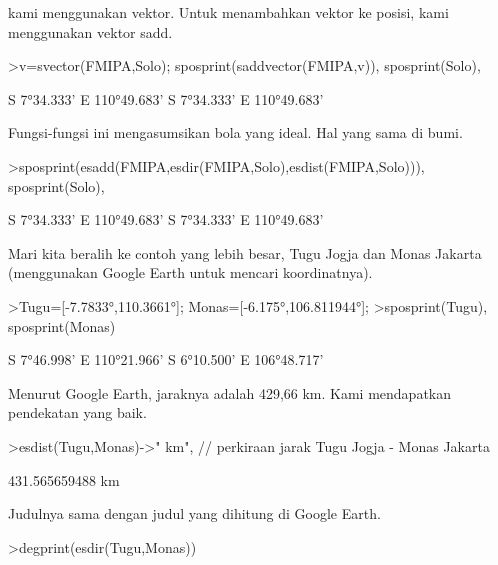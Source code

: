 \documentclass[a4paper,10pt]{article}
\begin{document}
\begin{eulernotebook}
\begin{eulercomment}
\begin{eulercomment}
\begin{eulercomment}
kami menggunakan vektor. Untuk menambahkan vektor ke posisi, kami
menggunakan vektor sadd.
\end{eulercomment}
\begin{eulerprompt}
>v=svector(FMIPA,Solo); sposprint(saddvector(FMIPA,v)), sposprint(Solo),
\end{eulerprompt}
\begin{euleroutput}
  S 7°34.333' E 110°49.683'
  S 7°34.333' E 110°49.683'
\end{euleroutput}
\begin{eulercomment}
Fungsi-fungsi ini mengasumsikan bola yang ideal. Hal yang sama di
bumi.
\end{eulercomment}
\begin{eulerprompt}
>sposprint(esadd(FMIPA,esdir(FMIPA,Solo),esdist(FMIPA,Solo))), sposprint(Solo),
\end{eulerprompt}
\begin{euleroutput}
  S 7°34.333' E 110°49.683'
  S 7°34.333' E 110°49.683'
\end{euleroutput}
\begin{eulercomment}
Mari kita beralih ke contoh yang lebih besar, Tugu Jogja dan Monas
Jakarta (menggunakan Google Earth untuk mencari koordinatnya).
\end{eulercomment}
\begin{eulerprompt}
>Tugu=[-7.7833°,110.3661°]; Monas=[-6.175°,106.811944°];
>sposprint(Tugu), sposprint(Monas)
\end{eulerprompt}
\begin{euleroutput}
  S 7°46.998' E 110°21.966'
  S 6°10.500' E 106°48.717'
\end{euleroutput}
\begin{eulercomment}
Menurut Google Earth, jaraknya adalah 429,66 km. Kami mendapatkan
pendekatan yang baik.
\end{eulercomment}
\begin{eulerprompt}
>esdist(Tugu,Monas)->" km", // perkiraan jarak Tugu Jogja - Monas Jakarta
\end{eulerprompt}
\begin{euleroutput}
  431.565659488 km
\end{euleroutput}
\begin{eulercomment}
Judulnya sama dengan judul yang dihitung di Google Earth.
\end{eulercomment}
\begin{eulerprompt}
>degprint(esdir(Tugu,Monas))
\end{eulerprompt}
\begin{euleroutput}

\end{euleroutput}
\end{eulercomment}
\end{eulercomment}
\end{eulernotebook}
\end{document}

